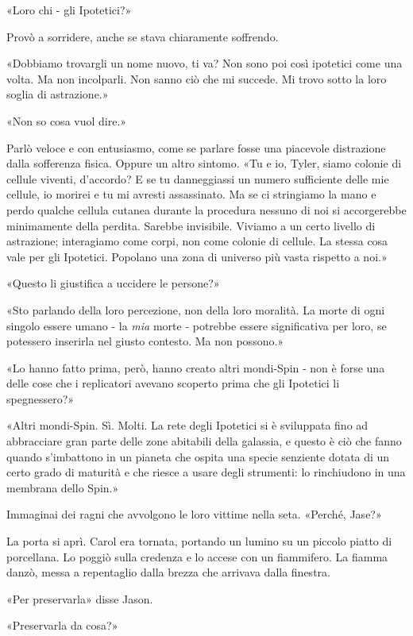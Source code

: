 «Loro chi - gli Ipotetici?»

Provò a sorridere, anche se stava chiaramente soffrendo.

«Dobbiamo trovargli un nome nuovo, ti va? Non sono poi così ipotetici
come una volta. Ma non incolparli. Non sanno ciò che mi succede. Mi
trovo sotto la loro soglia di astrazione.»

«Non so cosa vuol dire.»

Parlò veloce e con entusiasmo, come se parlare fosse una piacevole
distrazione dalla sofferenza fisica. Oppure un altro sintomo. «Tu e io,
Tyler, siamo colonie di cellule viventi, d'accordo? E se tu danneggiassi
un numero sufficiente delle mie cellule, io morirei e tu mi avresti
assassinato. Ma se ci stringiamo la mano e perdo qualche cellula cutanea
durante la procedura nessuno di noi si accorgerebbe minimamente della
perdita. Sarebbe invisibile. Viviamo a un certo livello di astrazione;
interagiamo come corpi, non come colonie di cellule. La stessa cosa vale
per gli Ipotetici. Popolano una zona di universo più vasta rispetto a
noi.»

«Questo li giustifica a uccidere le persone?»

«Sto parlando della loro percezione, non della loro moralità. La morte
di ogni singolo essere umano - la \emph{mia} morte - potrebbe essere
significativa per loro, se potessero inserirla nel giusto contesto. Ma
non possono.»

«Lo hanno fatto prima, però, hanno creato altri mondi-Spin - non è forse
una delle cose che i replicatori avevano scoperto prima che gli
Ipotetici li spegnessero?»

«Altri mondi-Spin. Sì. Molti. La rete degli Ipotetici si è sviluppata
fino ad abbracciare gran parte delle zone abitabili della galassia, e
questo è ciò che fanno quando s'imbattono in un pianeta che ospita una
specie senziente dotata di un certo grado di maturità e che riesce a
usare degli strumenti: lo rinchiudono in una membrana dello Spin.»

Immaginai dei ragni che avvolgono le loro vittime nella seta. «Perché,
Jase?»

La porta si aprì. Carol era tornata, portando un lumino su un piccolo
piatto di porcellana. Lo poggiò sulla credenza e lo accese con un
fiammifero. La fiamma danzò, messa a repentaglio dalla brezza che
arrivava dalla finestra.

«Per preservarla» disse Jason.

«Preservarla da cosa?»

